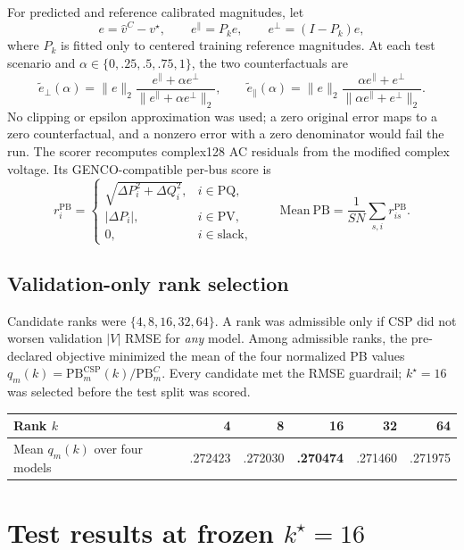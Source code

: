 \documentclass[10pt,a4paper]{article}
\newcommand{\PB}{\mathrm{PB}}
\newcommand{\Vm}{\lvert V\rvert}
\begin{document}
For predicted and reference calibrated magnitudes, let
\[
 e=\hat v^C-v^\star,\qquad e^\parallel=P_ke,\qquad e^\perp=(I-P_k)e,
\]
where $P_k$ is fitted only to centered training reference magnitudes.  At each
test scenario and $\alpha\in\{0,.25,.5,.75,1\}$, the two counterfactuals are
\[
 \tilde e_\perp(\alpha)=\lVert e\rVert_2
 \frac{e^\parallel+\alpha e^\perp}{\lVert e^\parallel+\alpha e^\perp\rVert_2},\qquad
 \tilde e_\parallel(\alpha)=\lVert e\rVert_2
 \frac{\alpha e^\parallel+e^\perp}{\lVert\alpha e^\parallel+e^\perp\rVert_2}.
\]
No clipping or epsilon approximation was used; a zero original error maps to a
zero counterfactual, and a nonzero error with a zero denominator would fail the
run.  The scorer recomputes complex128 AC residuals from the modified complex
voltage.  Its GENCO-compatible per-bus score is
\[
 r_i^{\PB}=\begin{cases}
 \sqrt{\Delta P_i^2+\Delta Q_i^2},&i\in\mathrm{PQ},\\
 |\Delta P_i|,&i\in\mathrm{PV},\\0,&i\in\mathrm{slack},\end{cases}
 \qquad \mathrm{Mean\ PB}=\frac{1}{SN}\sum_{s,i}r_{is}^{\PB}.
\]

\subsection*{Validation-only rank selection}

Candidate ranks were $\{4,8,16,32,64\}$.  A rank was admissible only if CSP
did not worsen validation $\Vm$ RMSE for \emph{any} model.  Among admissible
ranks, the pre-declared objective minimized the mean of the four normalized
PB values $q_m(k)=\mathrm{PB}^{\mathrm{CSP}}_m(k)/\mathrm{PB}^{C}_m$.
Every candidate met the RMSE guardrail; $k^\star=16$ was selected before the
test split was scored.

\begin{center}\small
\begin{tabular}{lrrrrr}
\toprule
Rank $k$ & 4 & 8 & \textbf{16} & 32 & 64\\
\midrule
Mean $q_m(k)$ over four models & .272423 & .272030 & \textbf{.270474} & .271460 & .271975\\
\bottomrule
\end{tabular}
\end{center}

\section{Test results at frozen $k^\star=16$}
\end{document}
